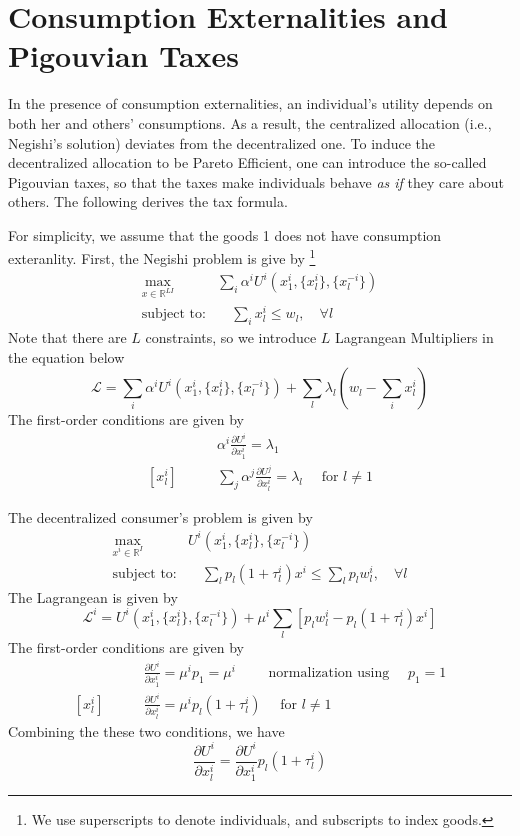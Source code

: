 \section{Consumption Externalities and Pigouvian Taxes}
In the presence of consumption externalities, an individual's 
utility depends on both her and others' consumptions.
As a result, the centralized allocation (i.e., Negishi's solution) deviates from the decentralized one.
To induce the decentralized allocation to be Pareto Efficient, one can introduce the so-called 
Pigouvian taxes, so that the taxes make individuals behave \textit{as if} they care about others.
The following derives the tax formula.

For simplicity, we assume that the goods 1 does not have consumption exteranlity.
First, the Negishi problem is give by%
\footnote{
    We use superscripts to denote individuals, and subscripts to index goods.
}
\begin{align*}
    \max_{x \in \mathbb{R}^{LI}} \quad & \sum_i \alpha^i U^i(x^i_1, \{x^i_l \}, \{x^{-i}_l \}) \\ 
    \text{subject to:} & \quad \sum_i x^i_l \leq w_l, \quad \forall l
\end{align*}
Note that there are $L$ constraints, so we introduce $L$ Lagrangean Multipliers in the equation below
\[
\mathcal{L} = \sum_i \alpha^i U^i(x^i_1, \{x^i_l \}, \{x^{-i}_l \}) + \sum_l \lambda_l \left(w_l - \sum_i x^i_l  \right)
\]
The first-order conditions are given by 
\begin{align*}
    [x^i_1] & \qquad \alpha^i \frac{\partial U^i}{\partial x^i_1} = \lambda_1 \\
    [x^i_l] & \qquad \sum_j \alpha^j \frac{\partial U^j}{\partial x^i_l} = \lambda_l \quad \text{ for } l \neq 1
\end{align*}


The decentralized consumer's problem is given by 
\begin{align*}
    \max_{x^i \in \mathbb{R}^{I}} \quad &   U^i(x^i_1, \{x^i_l \}, \{x^{-i}_l \}) \\ 
    \text{subject to:} & \quad \sum_l p_l (1 + \tau^i_l) x^i \leq \sum_l p_l w_l^i, \quad \forall l
\end{align*}
The Lagrangean is given by 
\[
\mathcal{L}^i =  U^i(x^i_1, \{x^i_l \}, \{x^{-i}_l \}) +  \mu^i \sum_l \left[p_l w_l^i - p_l (1 + \tau^i_l) x^i \right]
\]
The first-order conditions are given by 
\begin{align*}
    [x^i_1] & \qquad \frac{\partial U^i}{\partial x^i_1} = \mu^i p_1 = \mu^i \qquad \text{ normalization using } \quad p_1 = 1 \\
    [x^i_l] & \qquad \frac{\partial U^i}{\partial x^i_l} = \mu^i p_l (1 + \tau^i_l) \quad \text{ for } l \neq 1
\end{align*}
Combining the these two conditions, we have 
\[
\frac{\partial U^i}{\partial x^i_l} = \frac{\partial U^i}{\partial x^i_1}  p_l (1 + \tau^i_l)
\]

